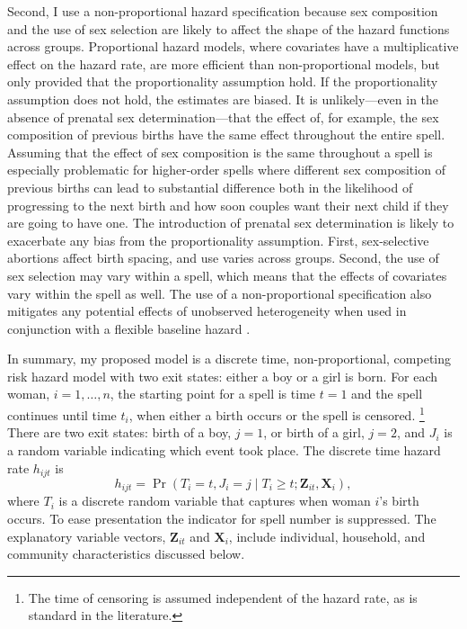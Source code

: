 \documentclass[12pt,letterpaper]{article}
\begin{document}
Second, I use a non-proportional hazard specification because
sex composition and the use of sex selection are likely to affect 
the shape of the hazard functions across groups.
Proportional hazard models, where covariates have a multiplicative 
effect on the hazard rate, are more efficient than non-proportional 
models, but only provided that the proportionality assumption hold.
If the proportionality assumption does not hold, the estimates
are biased.
It is unlikely---even in the absence of prenatal sex determination---that 
the effect of, for example, the sex composition of previous births have 
the same effect throughout the entire spell.
Assuming that the effect of sex composition is the same throughout a spell
is especially problematic for higher-order spells where different
sex composition of previous births can lead to substantial difference 
both in the likelihood of progressing to the next birth and
how soon couples want their next child if they are going to have one.
The introduction of prenatal sex determination is likely to exacerbate 
any bias from the proportionality assumption.
First, sex-selective abortions affect birth spacing, and use
varies across groups.
Second, the use of sex selection may vary within a spell, which means 
that the effects of covariates vary within the spell as well.
The use of a non-proportional specification also mitigates any potential 
effects of unobserved heterogeneity when used in conjunction with a 
flexible baseline hazard \citep{Dolton1995}.

In summary, my proposed model is a discrete time, non-proportional, competing risk 
hazard model with two exit states: either a boy or a girl is born.
For each woman, $i=1,\ldots,n$, the starting point for a spell is time $t=1$ and 
the spell continues until time $t_i$, when either a birth occurs or the spell 
is censored.%
\footnote{
The time of censoring is assumed independent of the hazard rate,
as is standard in the literature.
}
There are two exit states: birth of a boy, $j=1$, or birth of a girl, $j=2$, and 
$J_i$ is a random variable indicating which event took place.
The discrete time hazard rate $h_{ijt}$ is
\begin{equation}
 h_{ijt} = \Pr (T_i=t, J_i=j \mid T_i \geq t; \mathbf{Z}_{it},\mathbf{X}_{i} ),
\end{equation}
where $T_i$ is a discrete random variable that captures when woman $i$'s birth occurs.
To ease presentation the indicator for spell number is suppressed.
The explanatory variable vectors, $\mathbf{Z}_{it}$ and $\mathbf{X}_{i}$, include 
individual, household, and community characteristics discussed below.
\end{document}
